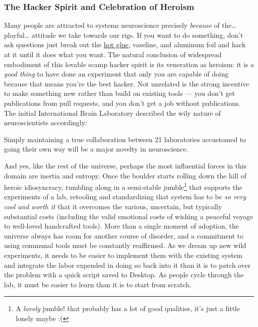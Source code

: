\documentclass[11pt]{article}
\begin{document}
\begin{multicols}{2}
{\subsubsection{The Hacker Spirit and Celebration of
Heroism}\label{the-hacker-spirit-and-celebration-of-heroism}}

Many people are attracted to systems neuroscience precisely
\emph{because} of the\ldots{} playful\ldots{} attitude we take towards
our rigs. If you want to do something, don't ask questions just break
out the \href{http://jvoigts.scripts.mit.edu/blog/review-hot-glue/}{hot
glue}, vaseline, and aluminum foil and hack at it until it does what you
want. The natural conclusion of widespread embodiment of this lovable
scamp hacker spirit is its veneration as heroism: it is a \emph{good
thing} to have done an experiment that only you are capable of doing
because that means you're the best hacker. Not unrelated is the strong
incentive to make something new rather than build on existing tools ---
you don't get publications from pull requests, and you don't get a job
without publications. The initial International Brain Laboratory
described the wily nature of neuroscientists accordingly:

\begin{leftbar}
Simply maintaining a true collaboration between 21 laboratories
accustomed to going their own way will be a major novelty in
neuroscience. \cite{abbottInternationalLaboratorySystems2017} 
\end{leftbar}

And yes, like the rest of the universe, perhaps the most influential
forces in this domain are inertia and entropy. Once the boulder starts
rolling down the hill of heroic idiosyncracy, tumbling along in a
semi-stable jumble\footnote{A \emph{lovely} jumble! that probably has a
  lot of good qualities, it's just a little lonely maybe :(} that
supports the experiments of a lab, retooling and standardizing that
system has to be \emph{so very cool and worth it} that it overcomes the
various, uncertain, but typically substantial costs (including the valid
emotional costs of wishing a peaceful voyage to well-loved handcrafted
tools). More than a single moment of adoption, the universe always has
room for another course of disorder, and a commitment to using communal
tools must be constantly reaffirmed. As we dream up new wild
experiments, it needs to be easier to implement them with the existing
system and integrate the labor expended in doing so back into it than it
is to patch over the problem with a quick script saved to Desktop. As
people cycle through the lab, it must be easier to learn than it is to
start from scratch.


\end{multicols}
\end{document}
